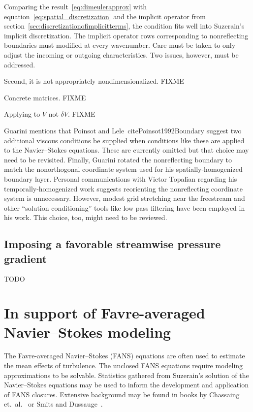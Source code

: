 \documentclass[letterpaper,11pt,nointlimits,reqno,draft]{amsart}
\begin{document}
Comparing the result~\eqref{eq:dimeulerapprox} with
equation~\eqref{eq:spatial_discretization} and the implicit operator from
section~\ref{sec:discretizationofimplicitterms}, the condition fits well into
Suzerain's implicit discretization.  The implicit operator rows corresponding
to nonreflecting boundaries must modified at every wavenumber.  Care must be
taken to only adjust the incoming or outgoing characteristics.  Two issues,
however, must be addressed.


Second, it is not appropriately nondimensionalized.
FIXME

Concrete matrices.
FIXME

Applying to $V$ not $\delta{}V$.
FIXME

Guarini mentions that Poinsot and Lele~cite{Poinsot1992Boundary} suggest two
additional viscous conditions be supplied when conditions like these are
applied to the Navier--Stokes equations.  These are currently omitted but that
choice may need to be revisited.  Finally, Guarini rotated the nonreflecting
boundary to match the nonorthogonal coordinate system used for his
spatially-homogenized boundary layer.  Personal communications with Victor
Topalian regarding his temporally-homogenized work suggests reorienting the
nonreflecting coordinate system is unnecessary.  However, modest grid
stretching near the freestream and other ``solution conditioning'' tools like
low pass filtering have been employed in his work.  This choice, too, might
need to be reviewed.

\subsection{Imposing a favorable streamwise pressure gradient}

TODO

\section{In support of Favre-averaged Navier--Stokes modeling}
\label{sec:supportFANS}

The Favre-averaged Navier--Stokes (FANS) equations are often used to estimate
the mean effects of turbulence.  The unclosed FANS equations require modeling
approximations to be solvable.  Statistics gathered from Suzerain's solution of
the Navier--Stokes equations may be used to inform the development and
application of FANS closures.  Extensive background may be found in
books by Chassaing et.~al.~\cite{Chassaing2010} or Smits and
Dussauge~\cite{SmitsDussauge2005}.
\end{document}
